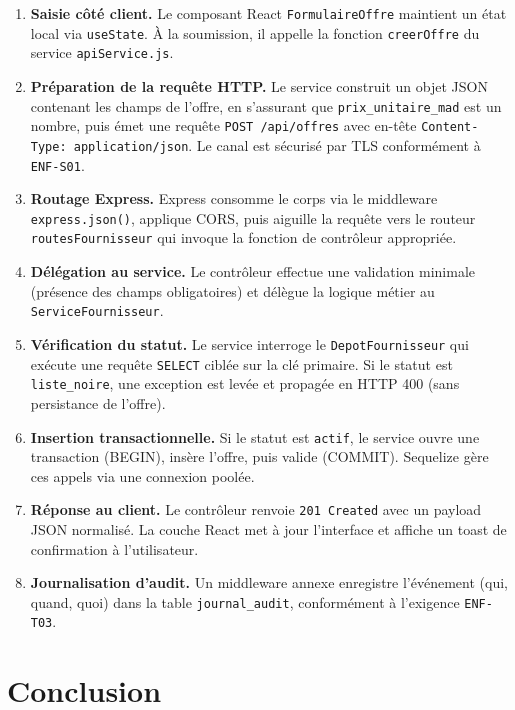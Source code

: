 \documentclass[a4paper,11pt,openany]{report}
\begin{document}
\begin{enumerate}[leftmargin=*]
  \item \textbf{Saisie côté client.} Le composant React
    \texttt{FormulaireOffre} maintient un état local via
    \texttt{useState}. À la soumission, il appelle la fonction
    \texttt{creerOffre} du service \texttt{apiService.js}.
  \item \textbf{Préparation de la requête HTTP.} Le service
    construit un objet JSON contenant les champs de l'offre, en
    s'assurant que \texttt{prix\_unitaire\_mad} est un nombre,
    puis émet une requête \texttt{POST /api/offres} avec en-tête
    \texttt{Content-Type: application/json}. Le canal est
    sécurisé par TLS conformément à \texttt{ENF-S01}.
  \item \textbf{Routage Express.} Express consomme le corps via
    le middleware \texttt{express.json()}, applique CORS, puis
    aiguille la requête vers le routeur \texttt{routesFournisseur}
    qui invoque la fonction de contrôleur appropriée.
  \item \textbf{Délégation au service.} Le contrôleur effectue
    une validation minimale (présence des champs obligatoires)
    et délègue la logique métier au \texttt{ServiceFournisseur}.
  \item \textbf{Vérification du statut.} Le service interroge le
    \texttt{DepotFournisseur} qui exécute une requête
    \texttt{SELECT} ciblée sur la clé primaire. Si le statut est
    \texttt{liste\_noire}, une exception est levée et propagée
    en HTTP 400 (sans persistance de l'offre).
  \item \textbf{Insertion transactionnelle.} Si le statut est
    \texttt{actif}, le service ouvre une transaction (BEGIN),
    insère l'offre, puis valide (COMMIT). Sequelize gère ces
    appels via une connexion poolée.
  \item \textbf{Réponse au client.} Le contrôleur renvoie
    \texttt{201 Created} avec un payload JSON normalisé. La
    couche React met à jour l'interface et affiche un toast de
    confirmation à l'utilisateur.
  \item \textbf{Journalisation d'audit.} Un middleware annexe
    enregistre l'événement (qui, quand, quoi) dans la table
    \texttt{journal\_audit}, conformément à l'exigence
    \texttt{ENF-T03}.
\end{enumerate}

\section{Conclusion}
\end{document}
